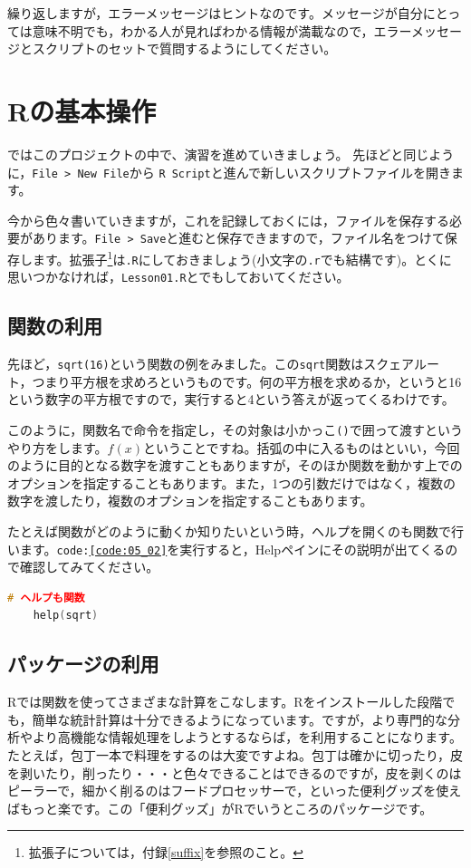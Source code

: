 \documentclass{ltjsbook}
\begin{document}
繰り返しますが，エラーメッセージはヒントなのです。メッセージが自分にとっては意味不明でも，わかる人が見ればわかる情報が満載なので，エラーメッセージとスクリプトのセットで質問するようにしてください。

\section{Rの基本操作}
ではこのプロジェクトの中で、演習を進めていきましょう。
先ほどと同じように，\verb|File > New File|から \verb|R Script|と進んで新しいスクリプトファイルを開きます。

今から色々書いていきますが，これを記録しておくには，ファイルを保存する必要があります。\verb|File > Save|と進むと保存できますので，ファイル名をつけて保存します。拡張子\footnote{拡張子については，付録\ref{suffix}を参照のこと。}は\texttt{.R}にしておきましょう(小文字の\texttt{.r}でも結構です)。とくに思いつかなければ，\texttt{Lesson01.R}とでもしておいてください。

\subsection{関数の利用}
先ほど，\texttt{sqrt(16)}という関数の例をみました。この\texttt{sqrt}関数はスクェアルート，つまり平方根を求めろというものです。何の平方根を求めるか，というと16という数字の平方根ですので，実行すると4という答えが返ってくるわけです。

このように，関数名で命令を指定し，その対象は小かっこ\verb|()|で囲って渡すというやり方をします。$f(x)$ということですね。括弧の中に入るものはといい，今回のように目的となる数字を渡すこともありますが，そのほか関数を動かす上でのオプションを指定することもあります。また，1つの引数だけではなく，複数の数字を渡したり，複数のオプションを指定することもあります。

たとえば関数がどのように動くか知りたいという時，ヘルプを開くのも関数で行います。\texttt{code:\ref{code:05_02}}を実行すると，Helpペインにその説明が出てくるので確認してみてください。
\begin{lstlisting}[language=c++,label={code:05_02},caption={ヘルプのコード}]
	# ヘルプも関数
	help(sqrt)
\end{lstlisting}
\subsection{パッケージの利用}
\label{HowToUseRpackage}
Rでは関数を使ってさまざまな計算をこなします。Rをインストールした段階でも，簡単な統計計算は十分できるようになっています。ですが，より専門的な分析やより高機能な情報処理をしようとするならば，を利用することになります。たとえば，包丁一本で料理をするのは大変ですよね。包丁は確かに切ったり，皮を剥いたり，削ったり・・・と色々できることはできるのですが，皮を剥くのはピーラーで，細かく削るのはフードプロセッサーで，といった便利グッズを使えばもっと楽です。この「便利グッズ」がRでいうところのパッケージです。
\end{document}
